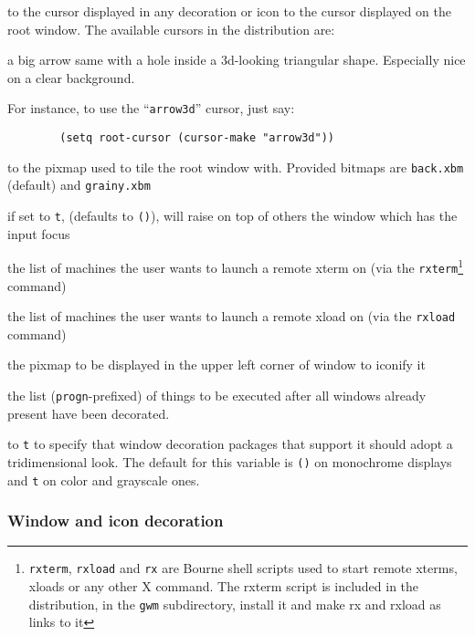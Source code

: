 \begin{description}

 to the cursor displayed in any decoration or icon
 to the cursor displayed on the root window. The
available cursors in the distribution are:
\begin{description} 
 a big arrow
 same with a hole inside
 a 3d-looking triangular shape. Especially nice on a clear
background.
\end{description}
For instance, to use the ``{\tt arrow3d}'' cursor, just say:
{\exemplefont\begin{verbatim}
        (setq root-cursor (cursor-make "arrow3d"))
\end{verbatim}}

 to the pixmap used to tile the root window with.
Provided bitmaps are \verb"back.xbm" (default) and \verb"grainy.xbm"

 if set to \verb"t", (defaults to \verb"()"), {\GWM} will
raise on top of others the window which has the input focus

 the list of machines the user wants to launch a remote
xterm on (via the \verb"rxterm"\footnote{{\tt rxterm}, {\tt rxload}
and {\tt rx} are Bourne shell scripts used to start remote xterms,
xloads or any other X command. The rxterm script is included in the
distribution, in the {\tt gwm} subdirectory, install it and make rx
and rxload as links to it} command)

 the list of machines the user wants to launch a remote
xload on (via the \verb"rxload" command) 

 the pixmap to be displayed in the upper left
corner of window to iconify it 

 the list (\verb"progn"-prefixed) of things
to be executed after all windows already present have been decorated.  

 to \verb"t" to specify that window decoration packages that
support it should adopt a tridimensional look. The default for this variable
is \verb"()" on monochrome displays and \verb"t" on color and grayscale ones.

\end{description}

\subsubsection{Window and icon decoration}

